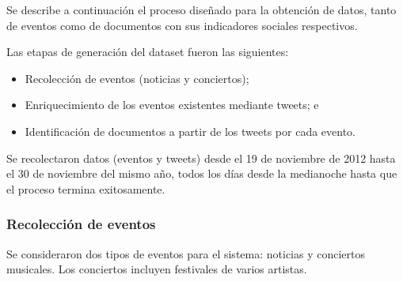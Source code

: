\documentclass[upright, contnum]{umemoria}
\begin{document}
    Se describe a continuación el proceso diseñado para la obtención de
    datos, tanto de eventos como de documentos con sus indicadores
    sociales respectivos.

    Las etapas de generación del dataset fueron las siguientes:

\begin{itemize}
\item Recolección de eventos (noticias y conciertos);
\item Enriquecimiento de los eventos existentes mediante tweets; e
\item Identificación de documentos a partir de los tweets por cada evento.
\end{itemize}
    Se recolectaron datos (eventos y tweets) desde el 19 de noviembre de
    2012 hasta el 30 de noviembre del mismo año, todos los días
    desde la medianoche hasta que el proceso termina exitosamente.

\subsubsection{Recolección de eventos}

Se consideraron dos tipos de eventos para el sistema: noticias y
conciertos musicales. Los conciertos incluyen festivales de varios
artistas.
\end{document}
